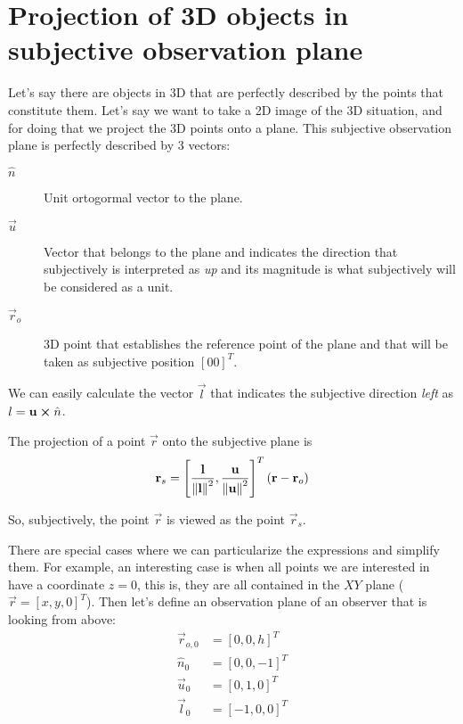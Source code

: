 \chapter{Projection of 3D objects in subjective observation plane}

Let's say there are objects in 3D that are perfectly described by the points that constitute them. Let's say we want to take a 2D image of the 3D situation, and for doing that we project the 3D points onto a plane. This subjective observation plane is perfectly described by 3 vectors:

\begin{description}
	\item[$\hat{n}$] Unit ortogormal vector to the plane.
	\item[$\vec{u}$] Vector that belongs to the plane and indicates the direction that subjectively is interpreted as \textit{up} and its magnitude is what subjectively will be considered as a unit.
	\item[$\vec{r}_o$] 3D point that establishes the reference point of the plane and that will be taken as subjective position $[0 0]^T$.
\end{description}

We can easily calculate the vector $\vec{l}$ that indicates the subjective direction \textit{left} as $l = \mathbf{u} \cross \hat{n}$.

The projection of a point $\vec{r}$ onto the subjective plane is
\begin{equation}
\mathbf{r}_s = \left[\frac{\mathbf{l}}{\left\| \mathbf{l} \right\|^2}, \frac{\mathbf{u}}{\left\| \mathbf{u} \right\|^2}\right]^T (\mathbf{r} - \mathbf{r}_o)
\end{equation}

So, subjectively, the point $\vec{r}$ is viewed as the point $\vec{r}_s$.

There are special cases where we can particularize the expressions and simplify them. For example, an interesting case is when all points we are interested in have a coordinate $z = 0$, this is, they are all contained in the $XY$ plane ($\vec{r} = [x, y, 0]^T$). Then let's define an observation plane of an observer that is looking from above:
\begin{equation}
\begin{aligned}
\vec{r}_{o, 0} &= [0, 0, h]^T \\
\hat{n}_0 &= [0, 0, -1]^T \\
\vec{u}_0 &= [0, 1, 0]^T \\
\vec{l}_0 &= [-1, 0, 0]^T
\end{aligned}
\end{equation}

